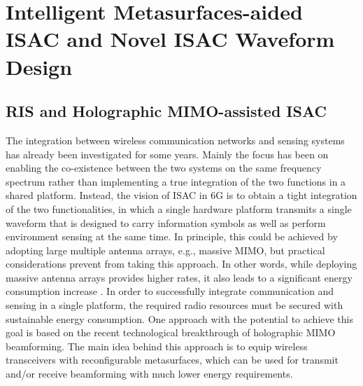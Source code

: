 \documentclass[journal, comsoc]{IEEEtran}
\begin{document}
\section{Intelligent Metasurfaces-aided ISAC and Novel ISAC Waveform Design}


\subsection{RIS and Holographic MIMO-assisted ISAC}
The integration between wireless communication networks and sensing systems has already been investigated for some years. Mainly the focus has been on enabling the co-existence between the two systems on the same frequency spectrum rather than implementing a true integration of the two functions in a shared platform. Instead, the vision of ISAC in 6G is to obtain a tight integration of the two functionalities, in which a single hardware platform transmits a single waveform that is designed to carry information symbols as well as perform environment sensing at the same time. In principle, this could be achieved by adopting large multiple antenna arrays, e.g., massive MIMO, but practical considerations prevent from taking this approach. In other words, while deploying massive antenna arrays provides higher rates, it also leads to a significant energy consumption increase \cite{eMIMO}. In order to successfully integrate communication and sensing in a single platform, the required radio resources must be secured with sustainable energy consumption. One approach with the potential to achieve this goal is based on the recent technological breakthrough of holographic MIMO beamforming. The main idea behind this approach is to equip wireless transceivers with reconfigurable metasurfaces, which can be used for transmit and/or receive beamforming with much lower energy requirements. 
\end{document}
